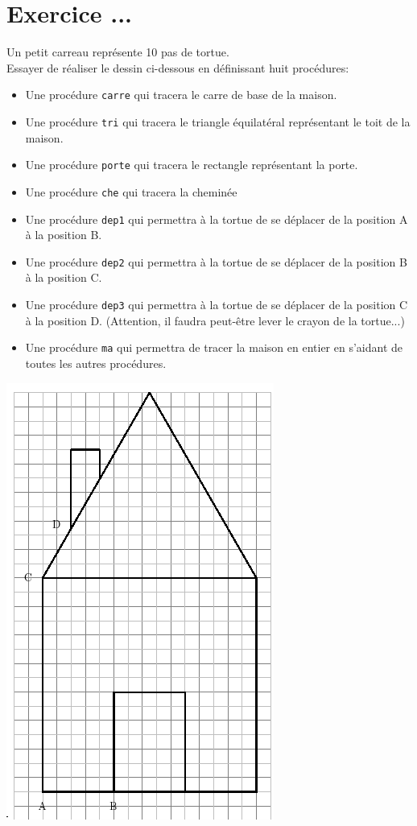 \section{Exercice ...}
\noindent
Un petit carreau représente 10 pas de tortue.\\
Essayer de réaliser le dessin ci-dessous en définissant huit procédures:
\begin{itemize}
\item Une procédure \og \texttt{carre} \fg{} qui tracera le carre de base
de la maison.
\item Une procédure \og \texttt{tri} \fg{} qui tracera le triangle équilatéral
représentant le toit de la maison.
\item Une procédure \og \texttt{porte} \fg{} qui tracera le rectangle
représentant la porte.
\item Une procédure \og \texttt{che} \fg{} qui tracera la cheminée
\item Une procédure \og \texttt{dep1} \fg{} qui permettra à la tortue
de se déplacer de la position A à la position B.
\item Une procédure \og \texttt{dep2} \fg{} qui permettra à la tortue
de se déplacer de la position B à la position C.
\item Une procédure \og \texttt{dep3} \fg{} qui permettra à la tortue
de se déplacer de la position C à la position D. (Attention, il faudra
peut-être lever le crayon de la tortue...)
\item Une procédure \og \texttt{ma} \fg{} qui permettra de tracer la maison
en entier en s'aidant de toutes les autres procédures.
\end{itemize}
\label{maison}
\begin{center}
\includegraphics[scale=0.6]{images/bases-maison.png}
\end{center}